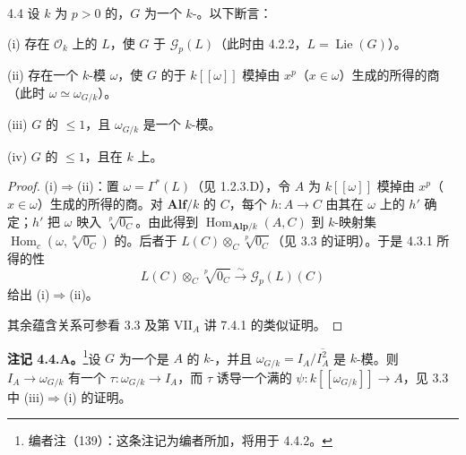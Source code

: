 \begin{SGAresult}{}{4.4}
设 $k$ 为 $p>0$ 的，$G$ 为一个 $k$-。以下断言：

(i) 存在 $\mathcal O_k$ 上的  $L$，使 $G$ 于 $\mathscr G_p(L)$（此时由 4.2.2，$L=\operatorname{Lie}(G)$）。

(ii) 存在一个 $k$-模 $\omega$，使 $G$ 的于 $k[[\omega]]$ 模掉由 $x^p$（$x\in\omega$）生成的所得的商（此时 $\omega\simeq\omega_{G/k}$）。

(iii) $G$ 的 $\leq1$，且 $\omega_{G/k}$ 是一个 $k$-模。

(iv) $G$ 的 $\leq1$，且在 $k$ 上。
\end{SGAresult}
\begin{proof}
(i)$\Rightarrow$(ii)：置 $\omega=\Gamma^*(L)$（见 1.2.3.D），令 $A$ 为 $k[[\omega]]$ 模掉由 $x^p$（$x\in\omega$）生成的所得的商。对 $\mathbf{Alf}/k$ 的 $C$，每个 $h:A\to C$ 由其在 $\omega$ 上的 $h'$ 确定；$h'$ 把 $\omega$ 映入 $\sqrt[p]{0_C}$。由此得到 $\operatorname{Hom}_{\mathbf{Alp}/k}(A,C)$ 到 $k$-映射集 $\operatorname{Hom}_c(\omega,\sqrt[p]{0_C})$ 的。后者于 $L(C)\otimes_C\sqrt[p]{0_C}$（见 3.3 的证明）。于是 4.3.1 所得的性
\[L(C)\otimes_C\sqrt[p]{0_C}\xrightarrow{\sim}\mathscr G_p(L)(C)\]
给出 (i)$\Rightarrow$(ii)。

其余蕴含关系可参看 3.3 及第 VII$_A$ 讲 7.4.1 的类似证明。
\end{proof}

\textbf{注记 4.4.A。}\footnote{编者注（139）：这条注记为编者所加，将用于 4.4.2。}设 $G$ 为一个是 $A$ 的 $k$-，并且 $\omega_{G/k}=I_A/\overline{I_A^2}$ 是 $k$-模。则 $I_A\to\omega_{G/k}$ 有一个 $\tau:\omega_{G/k}\to I_A$，而 $\tau$ 诱导一个满的 $\psi:k[[\omega_{G/k}]]\to A$，见 3.3 中 (iii)$\Rightarrow$(i) 的证明。

